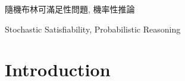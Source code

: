 




\frontmatter
\begin{acknowledgements}
  
\end{acknowledgements}

\begin{abstractzh}{隨機布林可滿足性問題, 機率性推論}
  
\end{abstractzh}

\begin{abstracten}{Stochastic Satisfiability, Probabilistic Reasoning}
  
\end{abstracten}

\tableofcontents
\clearpage
{}
\listoffigures
\clearpage
{}
\listoftables


\mainmatter
\chapter{Introduction}



\footnotesize


